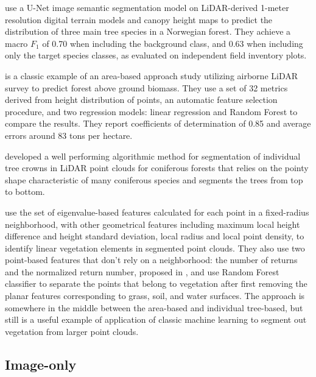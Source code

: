 \citet{vermeerLidarbasedNorwegianTree2023} use a U-Net \citep{ronnebergerUNetConvolutionalNetworks2015} image semantic segmentation model on LiDAR-derived 1-meter resolution digital terrain models and canopy height maps to predict the distribution of three main tree species in a Norwegian forest.
They achieve a macro $F_1$ of 0.70 when including the background class, and 0.63 when including only the target species classes, as evaluated on independent field inventory plots.

\citet{kcEstimationAboveGroundForest2024} is a classic example of an area-based approach study utilizing airborne LiDAR survey to predict forest above ground biomass.
They use a set of 32 metrics derived from height distribution of points, an automatic feature selection procedure, and two regression models: linear regression and Random Forest to compare the results.
They report coefficients of determination of 0.85 and average errors around 83 tons per hectare.

\citet{liNewMethodSegmenting2012} developed a well performing algorithmic method for segmentation of individual tree crowns in LiDAR point clouds for coniferous forests that relies on the pointy shape characteristic of many coniferous species and segments the trees from top to bottom.

\citet{lucasIdentificationLinearVegetation2019} use the set of eigenvalue-based features calculated for each point in a fixed-radius neighborhood, with other geometrical features including maximum local height difference and height standard deviation, local radius and local point density, to identify linear vegetation elements in segmented point clouds.
They also use two point-based features that don't rely on a neighborhood: the number of returns and the normalized return number, proposed in \citet{guoRelevanceAirborneLidar2011}, and use Random Forest classifier to separate the points that belong to vegetation after first removing the planar features corresponding to grass, soil, and water surfaces.
The approach is somewhere in the middle between the area-based and individual tree-based, but still is a useful example of application of classic machine learning to segment out vegetation from larger point clouds.

\subsection{Image-only}

